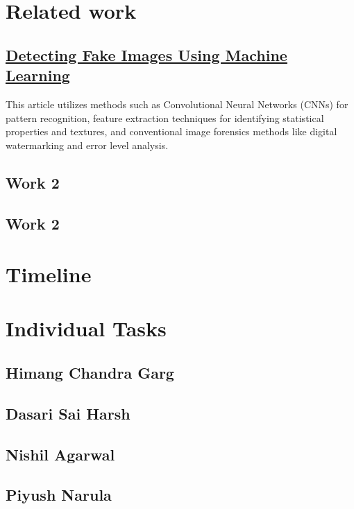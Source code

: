 \documentclass[10pt,twocolumn,letterpaper]{article}
\begin{document}
\section{Related work}

\subsection{\href{https://ijrpr.com/uploads/V4ISSUE4/IJRPR11629.pdf}{Detecting Fake Images Using Machine Learning}}
This article utilizes methods such as Convolutional Neural Networks (CNNs) for pattern recognition, feature extraction techniques for identifying statistical properties and textures, and conventional image forensics methods like digital watermarking and error level analysis.
\subsection{Work 2}

\subsection{Work 2}

\section{Timeline}

\section{Individual Tasks}

\subsection{Himang Chandra Garg}

\subsection{Dasari Sai Harsh}

\subsection{Nishil Agarwal}

\subsection{Piyush Narula}
\end{document}
